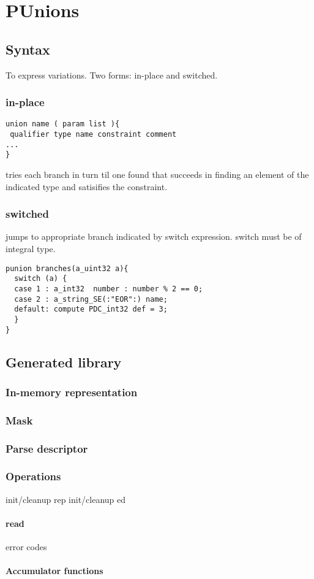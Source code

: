 \chapter{PUnions}
\label{chap:unions}
\section{Syntax}
To express variations.  Two forms: in-place and switched.
\subsection{in-place}
\begin{verbatim}
union name ( param list ){
 qualifier type name constraint comment
...
}
\end{verbatim}
tries each branch in turn til one found that succeeds in finding an
element of the indicated type and satisifies the constraint.

\subsection{switched}
jumps to appropriate branch indicated by switch expression.
switch must be of integral type. 
\begin{verbatim}
punion branches(a_uint32 a){
  switch (a) {
  case 1 : a_int32  number : number % 2 == 0;
  case 2 : a_string_SE(:"EOR":) name;
  default: compute PDC_int32 def = 3; 
  }
}
\end{verbatim}

\section{Generated library}
\subsection{In-memory representation}
\label{sec:unions-rep}
\subsection{Mask}
\label{sec:unions-masks}
\subsection{Parse descriptor}
\label{sec:unions-parse-descriptors}
\subsection{Operations}
init/cleanup rep
init/cleanup ed
\subsubsection{read}
  error codes
\subsubsection{Accumulator functions}

